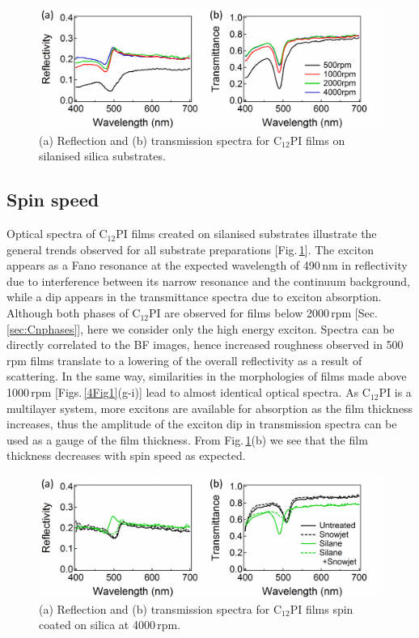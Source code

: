 \begin{figure}[h!]
\centering
\includegraphics[width=\textwidth]{Fig2}
\caption{(a) Reflection and (b) transmission spectra for C$_{12}$PI films on silanised silica substrates.}
\label{4Fig2}
\end{figure}
\subsection{Spin speed}
\label{sec:4-2}
Optical spectra of C$_{12}$PI films created on silanised substrates illustrate the general trends observed for all substrate preparations [Fig.\,\ref{4Fig2}]. The exciton appears as a Fano resonance at the expected wavelength of 490\,nm \cite{Pradeesh2009} in reflectivity due to interference between its narrow resonance and the continuum background, while a dip appears in the transmittance spectra due to exciton absorption. Although both phases of C$_{12}$PI are observed for films below 2000\,rpm [Sec.\,\ref{sec:Cnphases}], here we consider only the high energy exciton. Spectra can be directly correlated to the BF images, hence increased roughness observed in 500\,rpm films translate to a lowering of the overall reflectivity as a result of scattering. In the same way, similarities in the morphologies of films made above 1000\,rpm [Figs.\,\ref{4Fig1}(g-i)] lead to almost identical optical spectra. As C$_{12}$PI is a multilayer system, more excitons are available for absorption as the film thickness increases, thus the amplitude of the exciton dip in transmission spectra can be used as a gauge of the film thickness. From Fig.\,\ref{4Fig2}(b) we see that the film thickness decreases with spin speed as expected.

\begin{figure}[h!]
\centering
\includegraphics[width=\textwidth]{Fig3}
\caption{(a) Reflection and (b) transmission spectra for C$_{12}$PI films spin coated on silica at 4000\,rpm.}
\label{4Fig3}
\end{figure}
